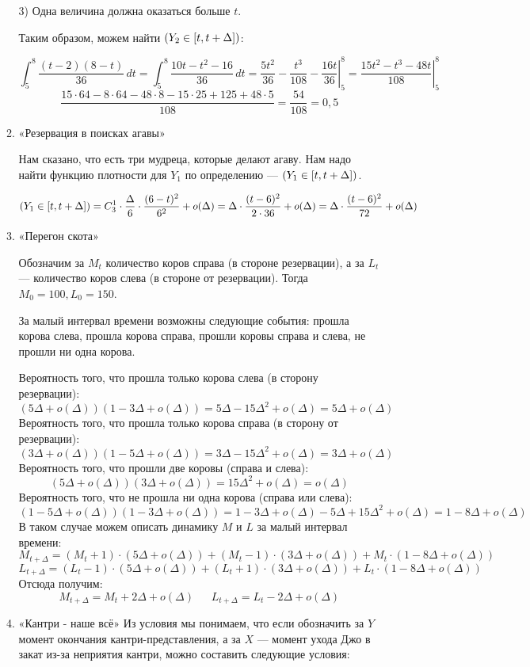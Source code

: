 \documentclass[11pt, a4paper]{article}
\let\P\relax
\DeclareMathOperator{\P}{\mathbb{P}}
\theoremstyle{definition}
\begin{document}
\begin{enumerate}
\begin{enumerate}
    3) Одна величина должна оказаться больше $t$.
    
    Таким образом, можем найти $ \P(Y_2 \in [t, t + \Delta])$:
    
    \[ 
    \int_5^8 \frac{(t - 2)(8-t)}{36}\,dt = \int_5^8 \frac{10t-t^2-16}{36}\,dt = \left. \frac{5t^2}{36} - \frac{t^3}{108} - \frac{16t}{36} \right|_5^8 = \left. \frac{15t^2-t^3-48t}{108} \right|_5^8 
    \]
    \[ 
    \frac{ 15 \cdot 64 - 8 \cdot 64 - 48 \cdot 8 - 15 \cdot 25 + 125 + 48 \cdot 5}{108} =  
   \frac{54}{108} = 0,5
    \]
    \item «Резервация в поисках агавы»
    
    Нам сказано, что есть три мудреца, которые делают агаву. Нам надо найти функцию плотности для $Y_1$ по определению — $ \P(Y_1 \in [t, t + \Delta])$.
    
    \[
    \P(Y_1 \in [t, t + \Delta]) =  C_3^1 \cdot \frac{\Delta}{6} \cdot \frac{(6-t)^2}{6^2} + o(\Delta) = \Delta \cdot \frac{(t-6)^2}{2 \cdot 36}
     +  o(\Delta) = \Delta \cdot \frac{(t-6)^2}{72}
     +  o(\Delta) \]
    
    \item «Перегон скота»
    
    Обозначим за $M_t$ количество коров справа (в стороне резервации), а за $L_t$ — количество коров слева (в стороне от резервации). Тогда $M_0 = 100, L_0 = 150$.
    
    За малый интервал времени возможны следующие события: прошла корова слева, прошла корова справа, прошли коровы справа и слева, не прошли ни одна корова.
    
    Вероятность того, что прошла только корова слева (в сторону резервации):
    \[
    (5\Delta + o(\Delta))(1 - 3\Delta + o(\Delta)) = 5\Delta - 15\Delta^2 + o(\Delta) = 5\Delta + o(\Delta)
    \]
    Вероятность того, что прошла только корова справа (в сторону  от резервации):
    \[
    (3\Delta + o(\Delta))(1 - 5\Delta + o(\Delta)) = 3\Delta - 15\Delta^2 + o(\Delta) = 3\Delta + o(\Delta)
    \]
    Вероятность того, что прошли две коровы (справа и слева):
    \[
    (5\Delta + o(\Delta))(3\Delta + o(\Delta)) = 15\Delta^2 + o(\Delta) =  o(\Delta) 
    \]
    Вероятность того, что не прошла ни одна корова (справа или слева):
    \[
    (1 - 5\Delta + o(\Delta))(1 - 3\Delta + o(\Delta)) = 1 - 3\Delta + o(\Delta) - 5\Delta + 15 \Delta^2 + o(\Delta) = 1 - 8\Delta + o(\Delta)
    \]
    В таком случае можем описать динамику $M$ и $L$ за малый интервал времени:
    \[
    M_{t+\Delta} = (M_t + 1) \cdot (5\Delta + o(\Delta)) + (M_t - 1) \cdot (3\Delta + o(\Delta)) + M_t \cdot (1 - 8\Delta + o(\Delta)) 
    \]
    \[
    L_{t+\Delta} = (L_t - 1) \cdot (5\Delta + o(\Delta)) + (L_t + 1) \cdot (3\Delta + o(\Delta)) + L_t \cdot (1 - 8\Delta + o(\Delta)) 
    \]
    Отсюда получим:
    \[
    M_{t+\Delta} = M_t + 2\Delta + o(\Delta) \ \ \ \ \ \ \ L_{t+\Delta} = L_t - 2\Delta + o(\Delta)
    \]
    \item «Кантри - наше всё»
    Из условия мы понимаем, что если обозначить за $Y$ момент окончания кантри-представления, а за $X$ — момент ухода Джо в закат из-за неприятия кантри, можно составить следующие условия:
    

\end{enumerate}
\end{enumerate}
\end{document}
